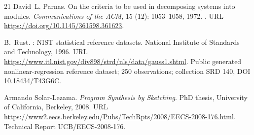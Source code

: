 \documentclass[11pt,letterpaper]{article}
\begin{document}
\begin{thebibliography}{21}
David~L. Parnas.
\newblock On the criteria to be used in decomposing systems into modules.
\newblock \emph{Communications of the ACM}, 15 (12):
  1053--1058, 1972.
\newblock {}.
\newblock URL \url{https://doi.org/10.1145/361598.361623}.

B.~Rust.
: {NIST} statistical reference datasets.
\newblock National Institute of Standards and Technology, 1996.
\newblock URL \url{https://www.itl.nist.gov/div898/strd/nls/data/gauss1.shtml}.
\newblock Public generated nonlinear-regression reference dataset; 250
  observations; collection SRD 140, DOI 10.18434/T43G6C.

Armando Solar-Lezama.
\newblock \emph{Program Synthesis by Sketching}.
\newblock PhD thesis, University of California, Berkeley, 2008.
\newblock URL
  \url{https://www2.eecs.berkeley.edu/Pubs/TechRpts/2008/EECS-2008-176.html}.
\newblock Technical Report UCB/EECS-2008-176.

\end{thebibliography}

\endgroup
\end{document}
